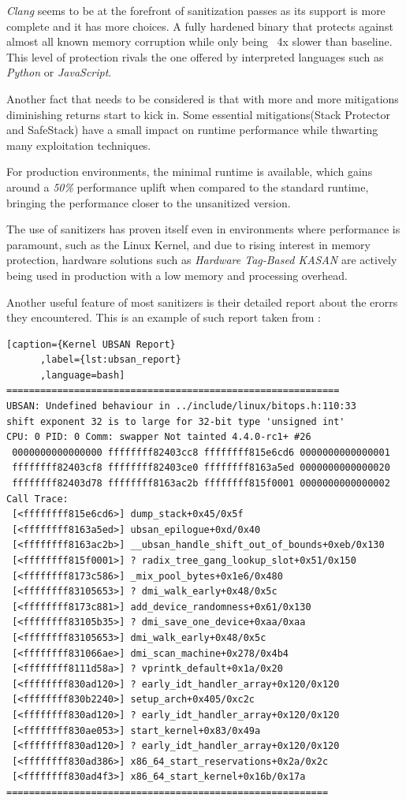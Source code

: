 \documentclass{article}
\begin{document}
\emph{Clang} seems to be at the forefront of sanitization passes as its support is more complete and it has more choices. A fully hardened binary that protects against almost all known memory corruption while only being ~4x slower than baseline. This level of protection rivals the one offered by interpreted languages such as \emph{Python} or \emph{JavaScript}.

Another fact that needs to be considered is that with more and more mitigations diminishing returns start to kick in. Some essential mitigations(Stack Protector and SafeStack) have a small impact on runtime performance while thwarting many exploitation techniques.

For production environments, the minimal runtime is available, which gains around a \emph{50\%} performance uplift when compared to the standard runtime, bringing the performance closer to the unsanitized version.

The use of sanitizers has proven itself even in environments where performance is paramount, such as the Linux Kernel, and due to rising interest in memory protection, hardware solutions such as \emph{Hardware Tag-Based KASAN} are actively being used in production with a low memory and processing overhead.

Another useful feature of most sanitizers is their detailed report about the erorrs they encountered. This is an example of such report taken from \cite{KernelUbsan}:

\begin{lstlisting}[caption={Kernel UBSAN Report}
      ,label={lst:ubsan_report}
      ,language=bash]
===========================================================
UBSAN: Undefined behaviour in ../include/linux/bitops.h:110:33
shift exponent 32 is to large for 32-bit type 'unsigned int'
CPU: 0 PID: 0 Comm: swapper Not tainted 4.4.0-rc1+ #26
 0000000000000000 ffffffff82403cc8 ffffffff815e6cd6 0000000000000001
 ffffffff82403cf8 ffffffff82403ce0 ffffffff8163a5ed 0000000000000020
 ffffffff82403d78 ffffffff8163ac2b ffffffff815f0001 0000000000000002
Call Trace:
 [<ffffffff815e6cd6>] dump_stack+0x45/0x5f
 [<ffffffff8163a5ed>] ubsan_epilogue+0xd/0x40
 [<ffffffff8163ac2b>] __ubsan_handle_shift_out_of_bounds+0xeb/0x130
 [<ffffffff815f0001>] ? radix_tree_gang_lookup_slot+0x51/0x150
 [<ffffffff8173c586>] _mix_pool_bytes+0x1e6/0x480
 [<ffffffff83105653>] ? dmi_walk_early+0x48/0x5c
 [<ffffffff8173c881>] add_device_randomness+0x61/0x130
 [<ffffffff83105b35>] ? dmi_save_one_device+0xaa/0xaa
 [<ffffffff83105653>] dmi_walk_early+0x48/0x5c
 [<ffffffff831066ae>] dmi_scan_machine+0x278/0x4b4
 [<ffffffff8111d58a>] ? vprintk_default+0x1a/0x20
 [<ffffffff830ad120>] ? early_idt_handler_array+0x120/0x120
 [<ffffffff830b2240>] setup_arch+0x405/0xc2c
 [<ffffffff830ad120>] ? early_idt_handler_array+0x120/0x120
 [<ffffffff830ae053>] start_kernel+0x83/0x49a
 [<ffffffff830ad120>] ? early_idt_handler_array+0x120/0x120
 [<ffffffff830ad386>] x86_64_start_reservations+0x2a/0x2c
 [<ffffffff830ad4f3>] x86_64_start_kernel+0x16b/0x17a
=========================================================
\end{lstlisting}
\end{document}
